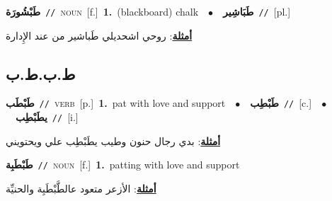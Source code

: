 \documentclass[10pt,a4paper,twoside]{article} %
\begin{document}
\begin{multicols}{2}
{\setlength\topsep{0pt}\textbf{\foreignlanguage{arabic}{طَبْشُورَة}}\ {\color{gray}\texttt{//}\color{black}}\ \textsc{noun}\ [f.]\ \textbf{1.}~(blackboard) chalk\ \ $\bullet$\ \ \setlength\topsep{0pt}\textbf{\foreignlanguage{arabic}{طَبَاشِير}}\ {\color{gray}\texttt{//}\color{black}}\ [pl.]\  \begin{flushright}\color{gray}\foreignlanguage{arabic}{\textbf{\underline{\foreignlanguage{arabic}{أمثلة}}}: روحي اشحديلي طَباشير من عند الإِدارة}\end{flushright}\color{black}} \vspace{2mm}

\vspace{-3mm}
\subsection*{\color{blue}\foreignlanguage{arabic}{ط.ب.ط.ب}\color{blue}{}} 

{\setlength\topsep{0pt}\textbf{\foreignlanguage{arabic}{طَبْطَب}}\ {\color{gray}\texttt{//}\color{black}}\ \textsc{verb}\ [p.]\ \textbf{1.}~pat with love and support\ \ $\bullet$\ \ \setlength\topsep{0pt}\textbf{\foreignlanguage{arabic}{طَبْطِب}}\ {\color{gray}\texttt{//}\color{black}}\ [c.]\ \ $\bullet$\ \ \setlength\topsep{0pt}\textbf{\foreignlanguage{arabic}{يطَبْطِب}}\ {\color{gray}\texttt{//}\color{black}}\ [i.]\  \begin{flushright}\color{gray}\foreignlanguage{arabic}{\textbf{\underline{\foreignlanguage{arabic}{أمثلة}}}: بدي رجال حنون وطيب يطَبْطِب علي ويحتويني}\end{flushright}\color{black}} \vspace{2mm}

{\setlength\topsep{0pt}\textbf{\foreignlanguage{arabic}{طَبْطَبِة}}\ {\color{gray}\texttt{//}\color{black}}\ \textsc{noun}\ [f.]\ \textbf{1.}~patting with love and support\  \begin{flushright}\color{gray}\foreignlanguage{arabic}{\textbf{\underline{\foreignlanguage{arabic}{أمثلة}}}: الأزعر متعود عالطَّبْطَبِة والحنيِّة}\end{flushright}\color{black}} \vspace{2mm}


\end{multicols}
\end{document}
